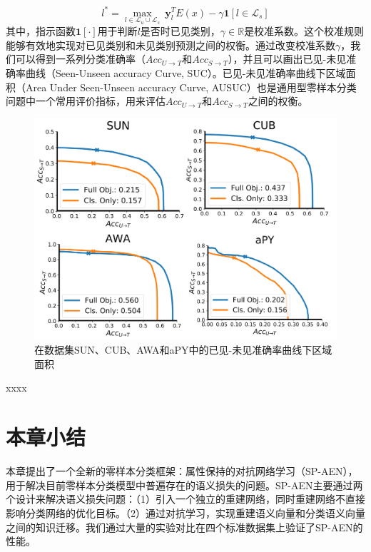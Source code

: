 \begin{equation}\label{ch3:eq:eq_8}
    l^* = \max_{l\in \mathcal{L}_u \cup \mathcal{L}_s }~\mathbf{y}^T_l E(x) - \gamma \mathbf{1} \left[ l \in \mathcal{L}_s \right]
\end{equation}
其中，指示函数$\mathbf{1} \left[ \cdot \right]$用于判断$l$是否时已见类别，$\gamma \in \mathbb{R}$是校准系数。这个校准规则能够有效地实现对已见类别和未见类别预测之间的权衡。通过改变校准系数$\gamma$，我们可以得到一系列分类准确率（$Acc_{U \to T}$和$Acc_{S \to T}$），并且可以画出已见-未见准确率曲线（Seen-Unseen accuracy Curve, SUC）。已见-未见准确率曲线下区域面积（Area Under Seen-Unseen accuracy Curve, AUSUC）也是通用型零样本分类问题中一个常用评价指标，用来评估$Acc_{U \to T}$和$Acc_{S \to T}$之间的权衡。

\begin{figure}[ht]
    \centering
    \includegraphics[width=0.8\linewidth]{chapter3/res/ausuc.pdf}
    \caption{在数据集SUN、CUB、AWA和aPY中的已见-未见准确率曲线下区域面积~\cite{chao2016empirical}}
\label{ch3:fig:ausuc}
\end{figure}


xxxx


\section{本章小结}

本章提出了一个全新的零样本分类框架：属性保持的对抗网络学习（SP-AEN），用于解决目前零样本分类模型中普遍存在的语义损失的问题。SP-AEN主要通过两个设计来解决语义损失问题：（1）引入一个独立的重建网络，同时重建网络不直接影响分类网络的优化目标。（2）通过对抗学习，实现重建语义向量和分类语义向量之间的知识迁移。我们通过大量的实验对比在四个标准数据集上验证了SP-AEN的性能。

